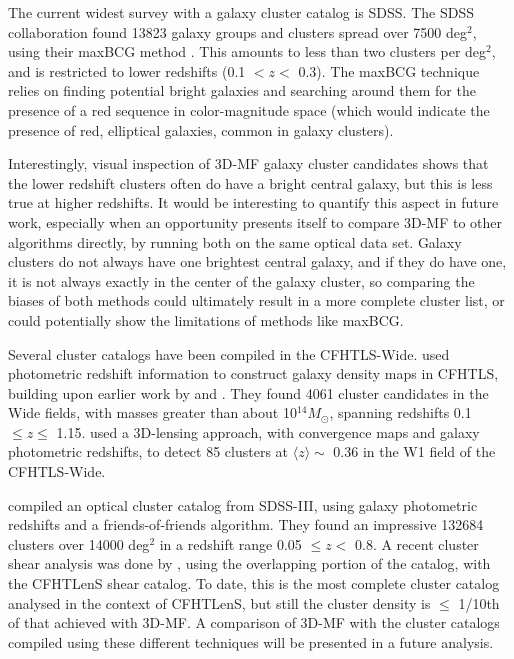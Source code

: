 The current widest survey with a galaxy cluster catalog is SDSS. The SDSS collaboration found 13823 galaxy groups and clusters spread over 7500 deg$^2$, using their maxBCG method \citep{Koester07}. This amounts to less than two clusters per deg$^2$, and is restricted to lower redshifts (0.1 $< z <$ 0.3). The maxBCG technique relies on finding potential bright galaxies and searching around them for the presence of a red sequence in color-magnitude space (which would indicate the presence of red, elliptical galaxies, common in galaxy clusters). 

Interestingly, visual inspection of \ac{3D-MF} galaxy cluster candidates shows that the lower redshift clusters often do have a bright central galaxy, but this is less true at higher redshifts. It would be interesting to quantify this aspect in future work, especially when an opportunity presents itself to compare \ac{3D-MF} to other algorithms directly, by running both on the same optical data set. Galaxy clusters do not always have one brightest central galaxy, and if they do have one, it is not always exactly in the center of the galaxy cluster, so comparing the biases of both methods could ultimately result in a more complete cluster list, or could potentially show the limitations of methods like maxBCG. 

Several cluster catalogs have been compiled in the \ac{CFHTLS}-Wide. \citet{Durret11} used photometric redshift information to construct galaxy density maps in \ac{CFHTLS}, building upon earlier work by \citet{Adami10} and \citet{Mazure07}. They found 4061 cluster candidates in the Wide fields, with masses greater than about 10$^{14} M_{\odot}$, spanning redshifts 0.1 $\le z \le$ 1.15. \citet{Shan12} used a 3D-lensing approach, with convergence maps and galaxy photometric redshifts, to detect 85 clusters at $\langle z \rangle \sim$ 0.36 in the W1 field of the \ac{CFHTLS}-Wide.

\citet{Wen12} compiled an optical cluster catalog from SDSS-III, using galaxy photometric redshifts and a friends-of-friends algorithm. They found an impressive 132684 clusters over 14000 deg$^2$ in a redshift range 0.05 $\leq z <$ 0.8. A recent cluster shear analysis was done by \citet{Covone14}, using the overlapping portion of the \citet{Wen12} catalog, with the \ac{CFHTLenS} shear catalog. To date, this is the most complete cluster catalog analysed in the context of \ac{CFHTLenS}, but still the cluster density is $\leq$ 1/10th of that achieved with \ac{3D-MF}. A comparison of \ac{3D-MF} with the cluster catalogs compiled using these different techniques will be presented in a future analysis.


